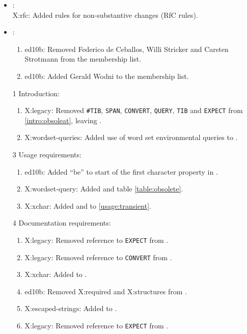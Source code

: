 	\begin{itemize}
	\item {}: \\
		\textsf{X:rfc}: Added rules for non-substantive changes (RfC rules).

	\item {}:
		\begin{enumerate}
		\item \textsf{ed10b}: Removed Federico de Ceballos, Willi Stricker
			and Carsten Strotmann from the \linebreak membership list.
		\item \textsf{ed10b}: Added Gerald Wodni to the membership list.
		\end{enumerate}

	\item[1] Introduction:
		\begin{enumerate}
		\item \textsf{X:legacy}: Removed \texttt{\#TIB}, \texttt{SPAN},
			\texttt{CONVERT}, \texttt{QUERY}, \texttt{TIB} and \texttt{EXPECT}
			from \ref{intro:obsoleat}, leaving .

		\item \textsf{X:wordset-queries}: Added use of word set environmental
			queries to .
		\end{enumerate}

	\item[3] Usage requirements:
		\begin{enumerate}
		\item \textsf{ed10b}: Added ``be'' to start of the first character
			property in .
		\item \textsf{X:wordset-query}: Added  and table
			\ref{table:obsolete}.
		\item \textsf{X:xchar}: Added  and  to
			\ref{usage:transient}.
		\end{enumerate}

	\item[4] Documentation requirements:
		\begin{enumerate}
		\item \textsf{X:legacy}: Removed reference to \texttt{EXPECT} from
			.
		\item \textsf{X:legacy}: Removed reference to \texttt{CONVERT} from
			.
		\item \textsf{X:xchar}: Added  to 
			.
		\item \textsf{ed10b}: Removed \textsf{X:required} and
			\textsf{X:structures} from .
		\item \textsf{X:escaped-strings}: Added  to .
		\item \textsf{X:legacy}: Removed reference to \texttt{EXPECT} from
			.
		\end{enumerate}


\end{itemize}
